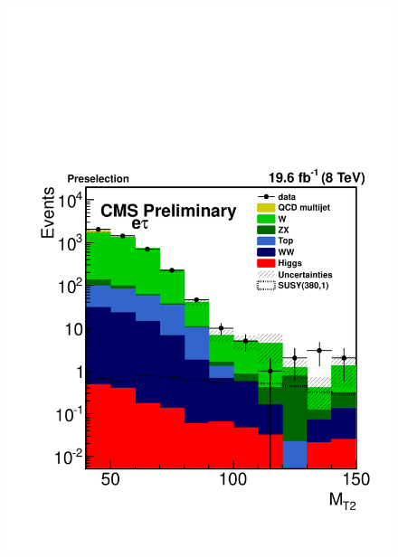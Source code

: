\begin{figure}[!htb]
\centering
\includegraphics[angle=0,scale=0.375]{SelectionEleTau/MT2.pdf}

\end{figure}
